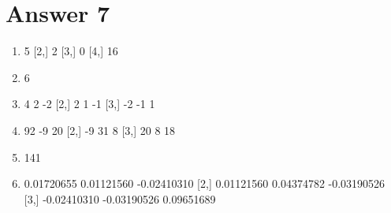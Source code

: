 \documentclass[12pt]{article}
\newcommand{\bn}{\begin{enumerate}}
\newcommand{\en}{\end{enumerate}}
\begin{document}
\section*{Answer 7}
\bn
\item
\begin{Schunk}
\begin{Soutput}
     [,1]
[1,]    5
[2,]    2
[3,]    0
[4,]   16
\end{Soutput}
\end{Schunk}
\item
\begin{Schunk}
\begin{Soutput}
     [,1]
[1,]    6
\end{Soutput}
\end{Schunk}
\item
\begin{Schunk}
\begin{Soutput}
     [,1] [,2] [,3]
[1,]    4    2   -2
[2,]    2    1   -1
[3,]   -2   -1    1
\end{Soutput}
\end{Schunk}
\item
\begin{Schunk}
\begin{Soutput}
     [,1] [,2] [,3]
[1,]   92   -9   20
[2,]   -9   31    8
[3,]   20    8   18
\end{Soutput}
\end{Schunk}
\item
\begin{Schunk}
\begin{Soutput}
[1] 141
\end{Soutput}
\end{Schunk}
\item
\begin{Schunk}
\begin{Soutput}
            [,1]        [,2]        [,3]
[1,]  0.01720655  0.01121560 -0.02410310
[2,]  0.01121560  0.04374782 -0.03190526
[3,] -0.02410310 -0.03190526  0.09651689
\end{Soutput}
\end{Schunk}
\en
\end{document}
